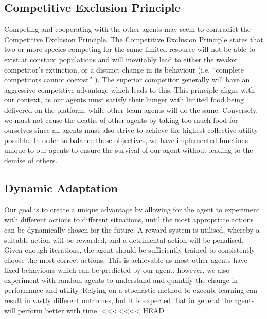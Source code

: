 \subsection{Competitive Exclusion Principle}
Competing and cooperating with the other agents may seem to contradict the Competitive Exclusion Principle. The Competitive Exclusion Principle states that two or more species competing for the same limited resource will not be able to exist at constant populations and will inevitably lead to either the weaker competitor’s extinction, or a distinct change in its behaviour (i.e. “complete competitors cannot coexist” \cite{HardinGarrett1960TCEP}). The superior competitor generally will have an aggressive competitive advantage which leads to this. This principle aligns with our context, as our agents must satisfy their hunger with limited food being delivered on the platform, while other team agents will do the same. Conversely, we must not cause the deaths of other agents by taking too much food for ourselves since all agents must also strive to achieve the highest collective utility possible. In order to balance these objectives, we have implemented functions unique to our agents to ensure the survival of our agent without leading to the demise of others.  

\subsection{Dynamic Adaptation}
Our goal is to create a unique advantage by allowing for the agent to experiment with different actions to different situations, until the most appropriate actions can be dynamically chosen for the future. A reward system is utilised, whereby a suitable action will be rewarded, and a detrimental action will be penalised. Given enough iterations, the agent should be sufficiently trained to consistently choose the most correct actions. This is achievable as most other agents have fixed behaviours which can be predicted by our agent; however, we also experiment with random agents to understand and quantify the change in performance and utility. Relying on a stochastic method to execute learning can result in vastly different outcomes, but it is expected that in general the agents will perform better with time.
<<<<<<< HEAD
